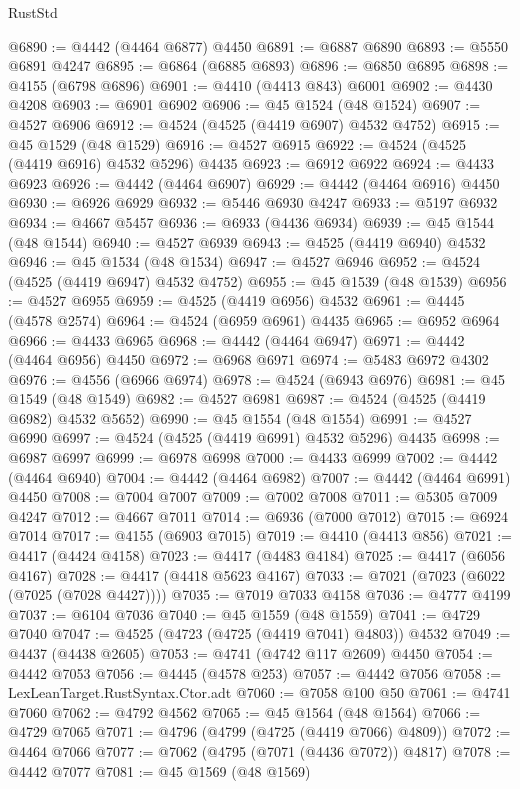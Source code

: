 \begin{lexlean}{RustStd}
\begin{coremodule}
@6890 := @4442 (@4464 @6877) @4450
@6891 := @6887 @6890
@6893 := @5550 @6891 @4247
@6895 := @6864 (@6885 @6893)
@6896 := @6850 @6895
@6898 := @4155 (@6798 @6896)
@6901 := @4410 (@4413 @843) @6001
@6902 := @4430 @4208
@6903 := @6901 @6902
@6906 := @45 @1524 (@48 @1524)
@6907 := @4527 @6906
@6912 := @4524 (@4525 (@4419 @6907) @4532 @4752)
@6915 := @45 @1529 (@48 @1529)
@6916 := @4527 @6915
@6922 := @4524 (@4525 (@4419 @6916) @4532 @5296) @4435
@6923 := @6912 @6922
@6924 := @4433 @6923
@6926 := @4442 (@4464 @6907)
@6929 := @4442 (@4464 @6916) @4450
@6930 := @6926 @6929
@6932 := @5446 @6930 @4247
@6933 := @5197 @6932
@6934 := @4667 @5457
@6936 := @6933 (@4436 @6934)
@6939 := @45 @1544 (@48 @1544)
@6940 := @4527 @6939
@6943 := @4525 (@4419 @6940) @4532
@6946 := @45 @1534 (@48 @1534)
@6947 := @4527 @6946
@6952 := @4524 (@4525 (@4419 @6947) @4532 @4752)
@6955 := @45 @1539 (@48 @1539)
@6956 := @4527 @6955
@6959 := @4525 (@4419 @6956) @4532
@6961 := @4445 (@4578 @2574)
@6964 := @4524 (@6959 @6961) @4435
@6965 := @6952 @6964
@6966 := @4433 @6965
@6968 := @4442 (@4464 @6947)
@6971 := @4442 (@4464 @6956) @4450
@6972 := @6968 @6971
@6974 := @5483 @6972 @4302
@6976 := @4556 (@6966 @6974)
@6978 := @4524 (@6943 @6976)
@6981 := @45 @1549 (@48 @1549)
@6982 := @4527 @6981
@6987 := @4524 (@4525 (@4419 @6982) @4532 @5652)
@6990 := @45 @1554 (@48 @1554)
@6991 := @4527 @6990
@6997 := @4524 (@4525 (@4419 @6991) @4532 @5296) @4435
@6998 := @6987 @6997
@6999 := @6978 @6998
@7000 := @4433 @6999
@7002 := @4442 (@4464 @6940)
@7004 := @4442 (@4464 @6982)
@7007 := @4442 (@4464 @6991) @4450
@7008 := @7004 @7007
@7009 := @7002 @7008
@7011 := @5305 @7009 @4247
@7012 := @4667 @7011
@7014 := @6936 (@7000 @7012)
@7015 := @6924 @7014
@7017 := @4155 (@6903 @7015)
@7019 := @4410 (@4413 @856)
@7021 := @4417 (@4424 @4158)
@7023 := @4417 (@4483 @4184)
@7025 := @4417 (@6056 @4167)
@7028 := @4417 (@4418 @5623 @4167)
@7033 := @7021 (@7023 (@6022 (@7025 (@7028 @4427))))
@7035 := @7019 @7033 @4158
@7036 := @4777 @4199
@7037 := @6104 @7036
@7040 := @45 @1559 (@48 @1559)
@7041 := @4729 @7040
@7047 := @4525 (@4723 (@4725 (@4419 @7041) @4803)) @4532
@7049 := @4437 (@4438 @2605)
@7053 := @4741 (@4742 @117 @2609) @4450
@7054 := @4442 @7053
@7056 := @4445 (@4578 @253)
@7057 := @4442 @7056
@7058 := LexLeanTarget.RustSyntax.Ctor.adt
@7060 := @7058 @100 @50
@7061 := @4741 @7060
@7062 := @4792 @4562
@7065 := @45 @1564 (@48 @1564)
@7066 := @4729 @7065
@7071 := @4796 (@4799 (@4725 (@4419 @7066) @4809))
@7072 := @4464 @7066
@7077 := @7062 (@4795 (@7071 (@4436 @7072)) @4817)
@7078 := @4442 @7077
@7081 := @45 @1569 (@48 @1569)

\end{coremodule}
\end{lexlean}
